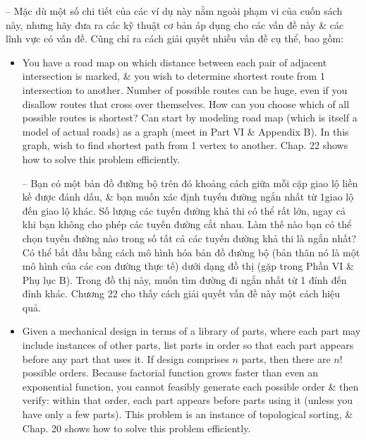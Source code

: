 \documentclass{article}
\begin{document}
\begin{itemize}
\begin{itemize}
\begin{itemize}
            -- Mặc dù một số chi tiết của các ví dụ này nằm ngoài phạm vi của cuốn sách này, nhưng hãy đưa ra các kỹ thuật cơ bản áp dụng cho các vấn đề này \& các lĩnh vực có vấn đề. Cũng chỉ ra cách giải quyết nhiều vấn đề cụ thể, bao gồm:
            \begin{itemize}
                \item You have a road map on which distance between each pair of adjacent intersection is marked, \& you wish to determine shortest route from 1 intersection to another. Number of possible routes can be huge, even if you disallow routes that cross over themselves. How can you choose which of all possible routes is shortest? Can start by modeling road map (which is itself a model of actual roads) as a graph (meet in Part VI \& Appendix B). In this graph, wish to find shortest path from 1 vertex to another. Chap. 22 shows how to solve this problem efficiently.
                
                -- Bạn có một bản đồ đường bộ trên đó khoảng cách giữa mỗi cặp giao lộ liền kề được đánh dấu, \& bạn muốn xác định tuyến đường ngắn nhất từ 1giao lộ đến giao lộ khác. Số lượng các tuyến đường khả thi có thể rất lớn, ngay cả khi bạn không cho phép các tuyến đường cắt nhau. Làm thế nào bạn có thể chọn tuyến đường nào trong số tất cả các tuyến đường khả thi là ngắn nhất? Có thể bắt đầu bằng cách mô hình hóa bản đồ đường bộ (bản thân nó là một mô hình của các con đường thực tế) dưới dạng đồ thị (gặp trong Phần VI \& Phụ lục B). Trong đồ thị này, muốn tìm đường đi ngắn nhất từ 1 đỉnh đến đỉnh khác. Chương 22 cho thấy cách giải quyết vấn đề này một cách hiệu quả.
                \item Given a mechanical design in terms of a library of parts, where each part may include instances of other parts, list parts in order so that each part appears before any part that uses it. If design comprises $n$ parts, then there are $n!$ possible orders. Because factorial function grows faster than even an exponential function, you cannot feasibly generate each possible order \& then verify: within that order, each part appears before parts using it (unless you have only a few parts). This problem is an instance of topological sorting, \& Chap. 20 shows how to solve this problem efficiently.
                

\end{itemize}
\end{itemize}
\end{itemize}
\end{itemize}
\end{document}

